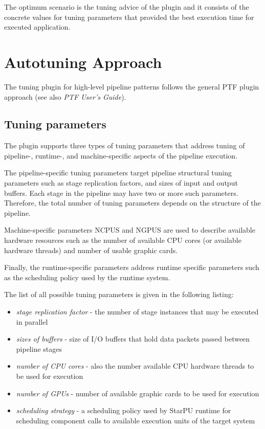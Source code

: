 \documentclass[11pt,a4paper, oneside]{book} %
\begin{document}
The optimum scenario is the tuning advice of the plugin and it consists of the concrete values for tuning parameters that provided the best execution time for executed application.

\chapter{Autotuning Approach}\label{sec:mappingPTF}
The tuning plugin for high-level pipeline patterns follows the general PTF plugin approach (see also \textit{PTF User's Guide}).

\section{Tuning parameters}

The plugin supports three types of tuning parameters that address tuning of pipeline-, runtime-, and machine-specific aspects of the pipeline execution.

The pipeline-specific tuning parameters target pipeline structural tuning parameters such as stage replication factors, and sizes of input and output buffers. Each stage in the pipeline may have two or more such parameters. Therefore, the total number of tuning parameters depends on the structure of the pipeline.

Machine-specific parameters NCPUS and NGPUS are used to describe available hardware resources such as the number of available CPU cores (or available hardware threads) and number of usable graphic cards.

Finally, the runtime-specific parameters address runtime specific parameters such as the  scheduling policy used by the runtime system.

The list of all possible tuning parameters is given in the following listing:

  \begin{itemize}
    \item \emph{stage replication factor} - the number of stage instances that may be
executed in parallel
    \item \emph{sizes of buffers} - size of I/O buffers that hold data packets passed between pipeline stages
    \item \emph{number of CPU cores} -  also the number available CPU hardware threads to be used for execution
    \item \emph{number of GPUs} - number of available graphic cards to be used for execution
    \item \emph{scheduling strategy} - a scheduling policy used by StarPU runtime for scheduling component calls to available execution units
of the target system
  \end{itemize}
\end{document}
